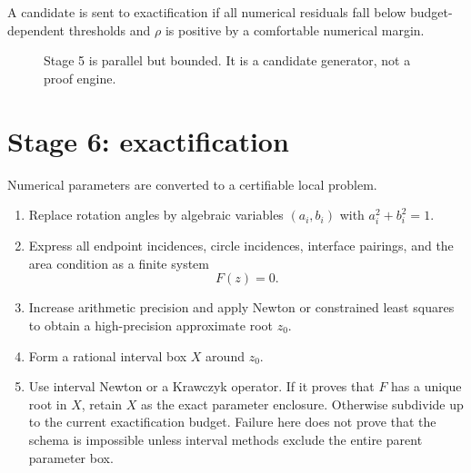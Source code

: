 \documentclass[11pt]{article}
\begin{document}
A candidate is sent to exactification if all numerical residuals fall below budget-dependent thresholds and $\rho$ is positive by a comfortable numerical margin.

\begin{figure}[ht]
\centering
{}
\caption{Stage 5 is parallel but bounded. It is a candidate generator, not a proof engine.}
\label{fig:islands}
\end{figure}

\section{Stage 6: exactification}

Numerical parameters are converted to a certifiable local problem.

\begin{enumerate}[leftmargin=9mm]
\item Replace rotation angles by algebraic variables $(a_i,b_i)$ with $a_i^2+b_i^2=1$.
\item Express all endpoint incidences, circle incidences, interface pairings, and the area condition as a finite system
\[
F(z)=0.
\]
\item Increase arithmetic precision and apply Newton or constrained least squares to obtain a high-precision approximate root $z_0$.
\item Form a rational interval box $X$ around $z_0$.
\item Use interval Newton or a Krawczyk operator. If it proves that $F$ has a unique root in $X$, retain $X$ as the exact parameter enclosure. Otherwise subdivide up to the current exactification budget. Failure here does not prove that the schema is impossible unless interval methods exclude the entire parent parameter box.
\end{enumerate}
\end{document}

